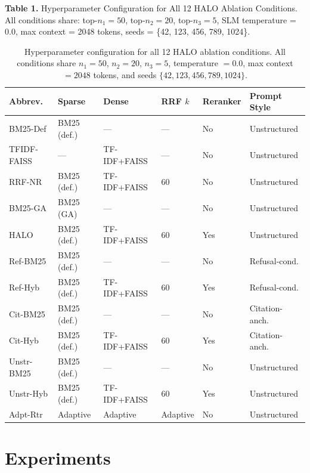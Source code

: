 \documentclass{article}
\begin{document}
\textbf{Table 1.} Hyperparameter Configuration for All 12 HALO Ablation Conditions. All conditions share: top-$n_1 = 50$, top-$n_2 = 20$, top-$n_3 = 5$, SLM temperature = 0.0, max context = 2048 tokens, seeds = \{42, 123, 456, 789, 1024\}.

\begin{table}[ht]
\centering
\small
\begin{tabular}{llllll}
\toprule
\textbf{Abbrev.} & \textbf{Sparse} & \textbf{Dense} & \textbf{RRF $k$} & \textbf{Reranker} & \textbf{Prompt Style} \\
\midrule
BM25-Def    & BM25 (def.) & ---           & ---      & No  & Unstructured   \\
TFIDF-FAISS & ---         & TF-IDF+FAISS  & ---      & No  & Unstructured   \\
RRF-NR      & BM25 (def.) & TF-IDF+FAISS  & 60       & No  & Unstructured   \\
BM25-GA     & BM25 (GA)   & ---           & ---      & No  & Unstructured   \\
HALO        & BM25 (def.) & TF-IDF+FAISS  & 60       & Yes & Unstructured   \\
Ref-BM25    & BM25 (def.) & ---           & ---      & No  & Refusal-cond.  \\
Ref-Hyb     & BM25 (def.) & TF-IDF+FAISS  & 60       & Yes & Refusal-cond.  \\
Cit-BM25    & BM25 (def.) & ---           & ---      & No  & Citation-anch. \\
Cit-Hyb     & BM25 (def.) & TF-IDF+FAISS  & 60       & Yes & Citation-anch. \\
Unstr-BM25  & BM25 (def.) & ---           & ---      & No  & Unstructured   \\
Unstr-Hyb   & BM25 (def.) & TF-IDF+FAISS  & 60       & Yes & Unstructured   \\
Adpt-Rtr    & Adaptive    & Adaptive      & Adaptive & No  & Unstructured   \\
\bottomrule
\end{tabular}
\caption{Hyperparameter configuration for all 12 HALO ablation conditions. All conditions share $n_1=50$, $n_2=20$, $n_3=5$, temperature $= 0.0$, max context $= 2048$ tokens, and seeds $\{42, 123, 456, 789, 1024\}$.}
\label{tab:1}
\end{table}

\section{Experiments}
\end{document}
